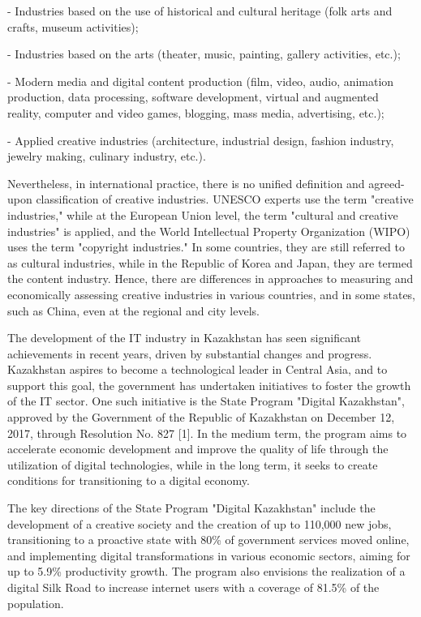 \begin{multicols}{2}
- Industries based on the use of historical and cultural heritage (folk
arts and crafts, museum activities);

- Industries based on the arts (theater, music, painting, gallery
activities, etc.);

- Modern media and digital content production (film, video, audio,
animation production, data processing, software development, virtual and
augmented reality, computer and video games, blogging, mass media,
advertising, etc.);

- Applied creative industries (architecture, industrial design, fashion
industry, jewelry making, culinary industry, etc.).

Nevertheless, in international practice, there is no unified definition
and agreed-upon classification of creative industries. UNESCO experts
use the term "creative industries," while at the European Union level,
the term "cultural and creative industries" is applied, and the World
Intellectual Property Organization (WIPO) uses the term "copyright
industries." In some countries, they are still referred to as cultural
industries, while in the Republic of Korea and Japan, they are termed
the content industry. Hence, there are differences in approaches to
measuring and economically assessing creative industries in various
countries, and in some states, such as China, even at the regional and
city levels.

The development of the IT industry in Kazakhstan has seen significant
achievements in recent years, driven by substantial changes and
progress. Kazakhstan aspires to become a technological leader in Central
Asia, and to support this goal, the government has undertaken
initiatives to foster the growth of the IT sector. One such initiative
is the State Program "Digital Kazakhstan", approved by the Government of
the Republic of Kazakhstan on December 12, 2017, through Resolution No.
827 {[}1{]}. In the medium term, the program aims to accelerate economic
development and improve the quality of life through the utilization of
digital technologies, while in the long term, it seeks to create
conditions for transitioning to a digital economy.

The key directions of the State Program "Digital Kazakhstan" include the
development of a creative society and the creation of up to 110,000 new
jobs, transitioning to a proactive state with 80\% of government
services moved online, and implementing digital transformations in
various economic sectors, aiming for up to 5.9\% productivity growth.
The program also envisions the realization of a digital Silk Road to
increase internet users with a coverage of 81.5\% of the population.


\end{multicols}
